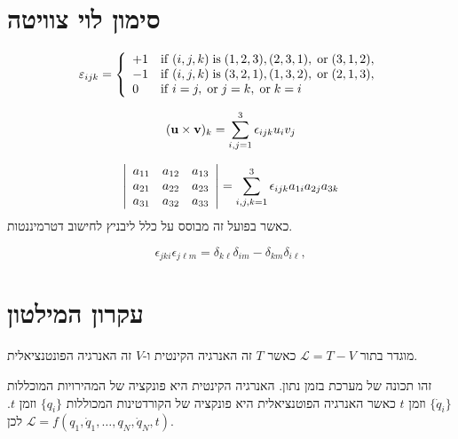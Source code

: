 \documentclass{tstextbook}
\begin{document}
\section{סימון לוי צוויטה}

\begin{definition}
$$\varepsilon_{i j k}={\left\{\begin{array}{l l}{+1}&{{\mathrm{if}}\;(i,j,k)\;{\mathrm{is}}\;(1,2,3),(2,3,1),\;{\mathrm{or}}\;(3,1,2),}\\ {-1}&{{\mathrm{if}}\;(i,j,k)\;{\mathrm{is}}\;(3,2,1),(1,3,2),\;{\mathrm{or}}\;(2,1,3),}\\ {0}&{{\mathrm{if}}\;i=j,\;{\mathrm{or}}\;j=k,\;{\mathrm{or}}\;k=i}\end{array}\right.}$$

\end{definition}
\begin{proposition}
$$({\bf u}\times{\bf v})_{k}=\sum_{i,j=1}^{3}\epsilon_{i j k}u_{i}v_{j}$$

\end{proposition}
\begin{proposition}
$${\left|\begin{array}{l l l}{a_{11}}&{a_{12}}&{a_{13}}\\ {a_{21}}&{a_{22}}&{a_{23}}\\ {a_{31}}&{a_{32}}&{a_{33}}\end{array}\right|}=\sum_{i,j,k=1}^{3}\epsilon_{i j k}a_{1i}a_{2j}a_{3k}$$
כאשר בפועל זה מבוסס על כלל ליבניץ לחישוב דטרמיננטות.

\end{proposition}
\begin{proposition}
$$\epsilon_{j k i}\epsilon_{j\ell m}=\delta_{k\ell}\delta_{i m}-\delta_{k m}\delta_{i\ell},$$

\end{proposition}

\section{עקרון המילטון}

\begin{definition}
מוגדר בתור \(\mathcal{L} =T-V\) כאשר \(T\) זה האנרגיה הקינטית ו-\(V\) זה האנרגיה הפונטנציאלית.

\end{definition}
זהו תכונה של מערכת בזמן נתון. האנרגיה הקינטית היא פונקציה של המהירויות המוכללות \(\{ \dot{q}_{i} \}\) וזמן \(t\) כאשר האנרגיה הפוטנציאלית היא פונקציה של הקורדטינות המכוללות \(\{ q_{i} \}\) וזמן \(t\). לכן \(\mathcal{L} =f\left( q_1,\dot{q}_{1},\dots,q_{N},\dot{q}_{N},t \right)\).
\end{document}
